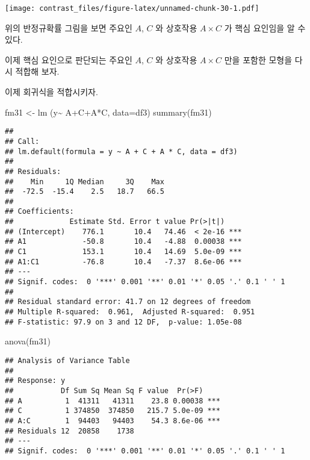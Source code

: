 \documentclass[
]{book}
\newenvironment{Shaded}{\begin{snugshade}}{\end{snugshade}}
\newcommand{\AttributeTok}[1]{\textcolor[rgb]{0.77,0.63,0.00}{#1}}
\newcommand{\FunctionTok}[1]{\textcolor[rgb]{0.00,0.00,0.00}{#1}}
\newcommand{\NormalTok}[1]{#1}
\newcommand{\OtherTok}[1]{\textcolor[rgb]{0.56,0.35,0.01}{#1}}
\newcommand{\SpecialCharTok}[1]{\textcolor[rgb]{0.00,0.00,0.00}{#1}}
\begin{document}
\texttt{[image: contrast\_files/figure-latex/unnamed-chunk-30-1.pdf]}

위의 반정규확률 그림을 보면 주요인 \(A\), \(C\) 와 상호작용 \(A \times C\) 가 핵심 요인임을 알 수 있다.

이제 핵심 요인으로 판단되는 주요인 \(A\), \(C\) 와 상호작용 \(A \times C\) 만을 포함한 모형을 다시 적합해 보자.

이제 회귀식을 적합시키자.

\begin{Shaded}
\begin{Highlighting}[]
\NormalTok{fm31 }\OtherTok{\textless{}{-}} \FunctionTok{lm}\NormalTok{ (y}\SpecialCharTok{\textasciitilde{}}\NormalTok{ A}\SpecialCharTok{+}\NormalTok{C}\SpecialCharTok{+}\NormalTok{A}\SpecialCharTok{*}\NormalTok{C, }\AttributeTok{data=}\NormalTok{df3) }
\FunctionTok{summary}\NormalTok{(fm31)}
\end{Highlighting}
\end{Shaded}

\begin{verbatim}
## 
## Call:
## lm.default(formula = y ~ A + C + A * C, data = df3)
## 
## Residuals:
##    Min     1Q Median     3Q    Max 
##  -72.5  -15.4    2.5   18.7   66.5 
## 
## Coefficients:
##             Estimate Std. Error t value Pr(>|t|)    
## (Intercept)    776.1       10.4   74.46  < 2e-16 ***
## A1             -50.8       10.4   -4.88  0.00038 ***
## C1             153.1       10.4   14.69  5.0e-09 ***
## A1:C1          -76.8       10.4   -7.37  8.6e-06 ***
## ---
## Signif. codes:  0 '***' 0.001 '**' 0.01 '*' 0.05 '.' 0.1 ' ' 1
## 
## Residual standard error: 41.7 on 12 degrees of freedom
## Multiple R-squared:  0.961,  Adjusted R-squared:  0.951 
## F-statistic: 97.9 on 3 and 12 DF,  p-value: 1.05e-08
\end{verbatim}

\begin{Shaded}
\begin{Highlighting}[]
\FunctionTok{anova}\NormalTok{(fm31)}
\end{Highlighting}
\end{Shaded}

\begin{verbatim}
## Analysis of Variance Table
## 
## Response: y
##           Df Sum Sq Mean Sq F value  Pr(>F)    
## A          1  41311   41311    23.8 0.00038 ***
## C          1 374850  374850   215.7 5.0e-09 ***
## A:C        1  94403   94403    54.3 8.6e-06 ***
## Residuals 12  20858    1738                    
## ---
## Signif. codes:  0 '***' 0.001 '**' 0.01 '*' 0.05 '.' 0.1 ' ' 1
\end{verbatim}

  
\end{document}
